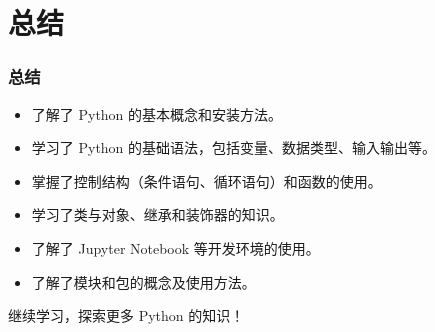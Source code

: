\section{总结}
\begin{frame}
    \frametitle{总结}
    \begin{itemize}
        \item 了解了 Python 的基本概念和安装方法。
        \item 学习了 Python 的基础语法，包括变量、数据类型、输入输出等。
        \item 掌握了控制结构（条件语句、循环语句）和函数的使用。
        \item 学习了类与对象、继承和装饰器的知识。
        \item 了解了 Jupyter Notebook 等开发环境的使用。
        \item 了解了模块和包的概念及使用方法。
    \end{itemize}
    继续学习，探索更多 Python 的知识！
\end{frame}
%
